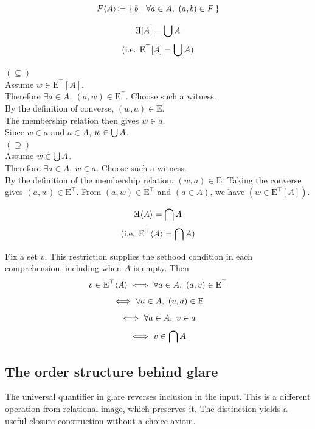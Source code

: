 \begin{definition}
\[
F\langle A \rangle\,{\coloneqq}\, \left\{\,b\ \middle|\ \forall a\in A,\  (a,b)\in F\,\right\}
\]
\end{definition}
\begin{theorem}
\[
\invE[A] = \union A
\]
\[
(\mbox{i.e. } \mbox{E}^{\top}[A]=\bigcup A )
\]
\end{theorem}
\Proof
$(\subseteq)$\\
Assume $w\in \mbox{E}^{\top}[A]$.\\
Therefore $\exists a\in A,\  (a,w)\in \mbox{E}^{\top}$. Choose such a witness.\\
By the definition of converse, $(w,a)\in \mbox{E}$.\\
The membership relation then gives $w\in a$.\\
Since $w\in a$ and $a\in A$, $w\in \bigcup A$.\\
$(\supseteq)$\\
Assume $w\in \bigcup A$.\\
Therefore $\exists a\in A,\  w\in a$. Choose such a witness.\\
By the definition of the membership relation, $(w,a)\in \mbox{E}$.
Taking the converse gives $(a,w)\in \mbox{E}^{\top}$.
From $(a,w)\in \mbox{E}^{\top}$ and $(a\in A)$, we have $(w\in \mbox{E}^{\top}[A])$.\\
\Done
\begin{theorem}
\[
\invE \langle A \rangle = \intersection A
\]
\[
(\mbox{i.e. } \mbox{E}^{\top}\langle A\rangle = \bigcap A )
\]
\end{theorem}
\Proof
Fix a set $v$. This restriction supplies the sethood condition in each
comprehension, including when $A$ is empty. Then
\[
v\in \mbox{E}^{\top}\langle A \rangle
\ \Longleftrightarrow\ 
\forall a\in A,\ (a,v)\in \mbox{E}^{\top}
\]
\[
\ \Longleftrightarrow\ 
\forall a\in A,\ (v,a)\in \mbox{E}
\]
\[
\ \Longleftrightarrow\ 
\forall a\in A,\ v \in a
\]
\[
\ \Longleftrightarrow\ 
v \in \bigcap A
\]
\Done
\subsection{The order structure behind glare}
The universal quantifier in glare reverses inclusion in the input.
This is a different operation from relational image, which preserves it.
The distinction yields a useful closure construction without a choice axiom.


